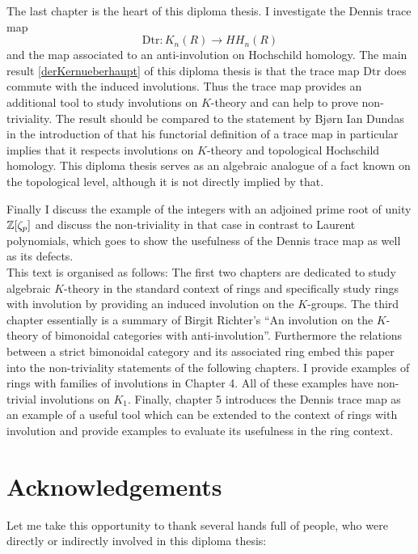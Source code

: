 The last chapter is the heart of this diploma thesis. I investigate the Dennis trace map
$$\mathrm{Dtr}\colon K_n(R) \rightarrow HH_n(R)$$
and the map associated to an anti-involution on Hochschild homology.
The main result \ref{derKernueberhaupt} of this diploma thesis is that the trace map $\mathrm{Dtr}$ does commute with the induced involutions.
Thus the trace map provides an additional tool to study involutions on $K$-theory and can help to prove non-triviality.
The result should be compared to the statement by Bj\o{}rn Ian Dundas in the introduction of \cite{dundas2000cyclotomic} that his
functorial definition of a trace map in particular implies that it respects involutions on $K$-theory and topological Hochschild homology.
This diploma thesis serves as an algebraic analogue of a fact known on the topological level, although it is not directly implied by that.

Finally I discuss the example of the integers with an adjoined prime root of unity $\mathbb{Z}\lbrack \zeta_p \rbrack$ and discuss the non-triviality
in that case in contrast to Laurent polynomials, which goes to show the usefulness of the Dennis trace map as well as its defects.\\[2ex]

This text is organised as follows:
The first two chapters are dedicated to study algebraic $K$-theory in the standard context of rings and specifically study rings with involution by
providing an induced involution on the $K$-groups.
The third chapter essentially is a summary of Birgit Richter's ``An involution on the $K$-theory of
bimonoidal categories with anti-involution''\cite{richter2010involution}. Furthermore the relations between
a strict bimonoidal category and its associated ring embed this paper into the non-triviality statements of the
following chapters.
I provide examples of rings with families of involutions in Chapter 4. All of these examples have non-trivial involutions on $K_1$.
Finally, chapter 5 introduces the Dennis trace map as an example of a useful tool which can be extended to the context
of rings with involution and provide examples to evaluate its usefulness in the ring context.

\section*{Acknowledgements}
Let me take this opportunity to thank several hands full of people, who were directly or indirectly involved in this diploma thesis:

